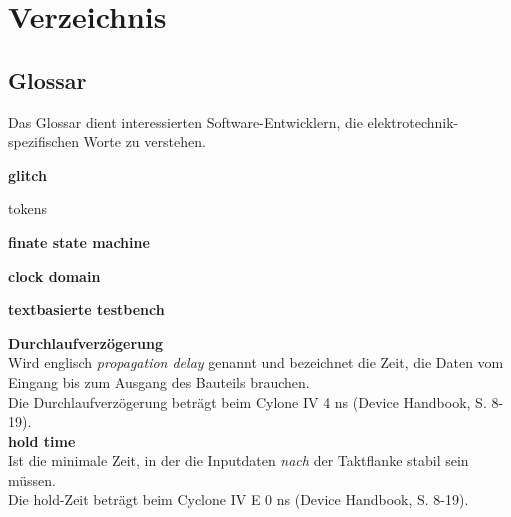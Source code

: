 
\chapter{Verzeichnis}\label{chap.verzeichnis}



\makeatletter
\renewcommand*\bib@heading{ \section{\refname}}
\makeatother



 


\section{Glossar}\label{sect.verzeichnis_glossar}
Das Glossar dient interessierten Software-Entwicklern, die elektrotechnik-spezifischen Worte zu verstehen.

\textbf{glitch}

tokens

\textbf{finate state machine}



\textbf{clock domain}


\textbf{textbasierte testbench}


\textbf{Durchlaufverzögerung}\\

Wird englisch \textit{propagation delay} genannt und bezeichnet die Zeit, die Daten vom Eingang bis zum Ausgang des Bauteils brauchen.\\
Die Durchlaufverzögerung beträgt beim Cylone IV 4 ns (Device Handbook, S. 8-19).\\


\textbf{hold time}\\
Ist die minimale Zeit, in der die Inputdaten \textit{nach} der Taktflanke stabil sein müssen.\\
Die hold-Zeit beträgt beim  Cyclone IV E 0 ns (Device Handbook, S. 8-19).\\


